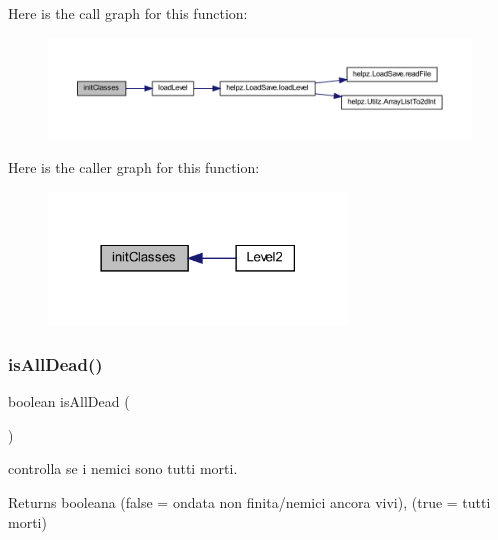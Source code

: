 Here is the call graph for this function\+:\nopagebreak
\begin{figure}[H]
\begin{center}
\leavevmode
\includegraphics[width=350pt]{classscenes_1_1_level2_afe125d345675ffefe8da7e96d39773f3_cgraph}
\end{center}
\end{figure}
Here is the caller graph for this function\+:\nopagebreak
\begin{figure}[H]
\begin{center}
\leavevmode
\includegraphics[width=225pt]{classscenes_1_1_level2_afe125d345675ffefe8da7e96d39773f3_icgraph}
\end{center}
\end{figure}
\mbox{\label{classscenes_1_1_level2_acd1846d50c3d8678777f9ab6716f5cf3}} 
\subsubsection{\texorpdfstring{is\+All\+Dead()}{isAllDead()}}
{\footnotesize\ttfamily boolean is\+All\+Dead (\begin{DoxyParamCaption}{ }\end{DoxyParamCaption})\hspace{0.3cm}{\ttfamily [private]}}



controlla se i nemici sono tutti morti. 

\begin{DoxyReturn}{Returns}
booleana (false = ondata non finita/nemici ancora vivi), (true = tutti morti) 
\end{DoxyReturn}


